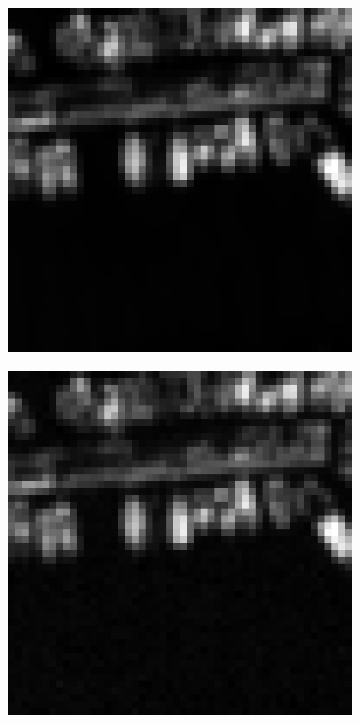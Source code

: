 \begin{figure}[htpb]
\begin{subfigure}{.2\textwidth}
\includegraphics[width=\textwidth]{img/image2NoiseLevel1}
\end{subfigure}%
\begin{subfigure}{.2\textwidth}
\includegraphics[width=\textwidth]{img/image2NoiseLevel2}

\end{subfigure}
\end{figure}
